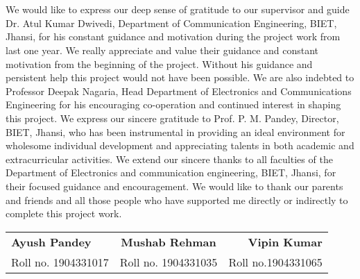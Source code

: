 \section*{}
\noindent We would like to express our deep sense of gratitude to our supervisor and guide Dr. Atul Kumar Dwivedi, Department of Communication Engineering, BIET, Jhansi, for his constant guidance and motivation during the project work from last one year. We really appreciate and value their  guidance and constant motivation from the beginning of the project. Without his guidance and persistent help this project would not have been possible. 
We are also indebted to Professor Deepak Nagaria, Head Department of Electronics and Communications Engineering for his encouraging co-operation and continued interest in shaping this project.
We express our sincere gratitude to Prof. P. M. Pandey, Director, BIET, Jhansi, who has been instrumental in providing an ideal environment for wholesome individual development and appreciating talents in both academic and extracurricular activities.
We extend our sincere thanks to all faculties of the Department of Electronics and communication engineering, BIET, Jhansi, for their focused guidance and encouragement.
We would like to thank our parents and friends and all those people who have supported me directly or indirectly to complete this project work. 

\par	
	\vspace{0.008cm}
	\noindent
		\begin{tabular}{lcr}
		\\
		\bfseries  Ayush Pandey & \hspace{1.5cm} \textbf{Mushab Rehman} & \bfseries \hspace{2.5cm}  Vipin Kumar\\
			Roll no. 1904331017 & \hspace{1.5cm}Roll no. 1904331035  &
   Roll no.1904331065
		\end{tabular}